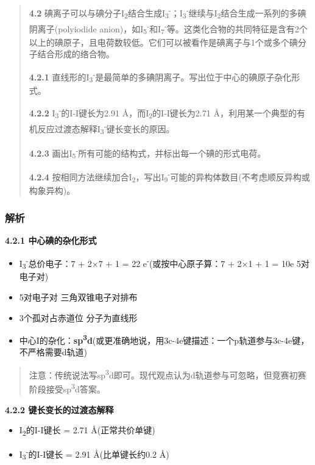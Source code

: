 \begin{quote}
\textbf{4.2} 碘离子可以与碘分子I\textsubscript{2}结合生成I\textsubscript{3}\textsuperscript{-}；I\textsubscript{3}\textsuperscript{-}继续与I\textsubscript{2}结合生成一系列的多碘阴离子(polyiodide anion)，如I\textsubscript{5}\textsuperscript{-}和I\textsubscript{7}\textsuperscript{-}等。这类化合物的共同特征是含有2个以上的碘原子，且电荷数较低。它们可以被看作是碘离子与1个或多个碘分子结合形成的络合物。

\textbf{4.2.1} 直线形的I\textsubscript{3}\textsuperscript{-}是最简单的多碘阴离子。写出位于中心的碘原子杂化形式。

\textbf{4.2.2} I\textsubscript{3}\textsuperscript{-}的I-I键长为2.91 Å，而I\textsubscript{2}的I-I键长为2.71 Å，利用某一个典型的有机反应过渡态解释I\textsubscript{3}\textsuperscript{-}键长变长的原因。

\textbf{4.2.3} 画出I\textsubscript{5}\textsuperscript{-}所有可能的结构式，并标出每一个碘的形式电荷。

\textbf{4.2.4} 按相同方法继续加合I\textsubscript{2}，写出I\textsubscript{9}\textsuperscript{-}可能的异构体数目(不考虑顺反异构或构象异构)。
\end{quote}

\subsubsection{解析}\label{ux89e3ux6790-1}

\textbf{4.2.1 中心碘的杂化形式}

\begin{itemize}
\tightlist
\item
  I\textsubscript{3}\textsuperscript{-}总价电子：7 + 2×7 + 1 = 22 e\textsuperscript{-}(或按中心原子算：7 + 2×1 + 1 = 10e \箭 5对电子对)
\item
  5对电子对 \箭 三角双锥电子对排布
\item
  3个孤对占赤道位 \箭 分子为直线形
\item
  中心I的杂化：\textbf{sp\textsuperscript{3}d}(或更准确地说，用3c-4e键描述：一个p轨道参与3c-4e键，不严格需要d轨道)
\end{itemize}

\begin{quote}
注意：传统说法写sp\textsuperscript{3}d即可。现代观点认为d轨道参与可忽略，但竞赛初赛阶段接受sp\textsuperscript{3}d答案。
\end{quote}

\textbf{4.2.2 键长变长的过渡态解释}

\begin{itemize}
\tightlist
\item
  I\textsubscript{2}的I-I键长 = 2.71 Å(正常共价单键)
\item
  I\textsubscript{3}\textsuperscript{-}的I-I键长 = 2.91 Å(比单键长约0.2 Å)
\end{itemize}

